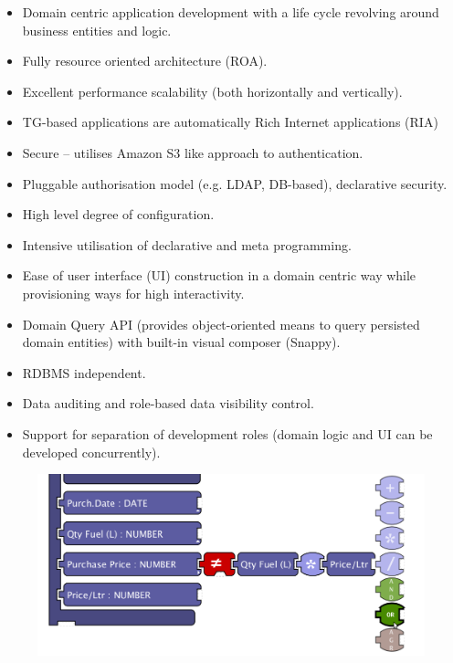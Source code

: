 \documentclass[a4paper,12pt,twocolumn,oneside,openright,final]{memoir}
\begin{document}
  \begin{itemize}
    \item Domain centric application development with a life cycle revolving around business entities and logic.
    \item Fully resource oriented architecture (ROA).
    \item Excellent performance scalability (both horizontally and vertically).
    \item TG-based applications are automatically Rich Internet applications (RIA)
    \item Secure -- utilises Amazon S3 like approach to authentication.
    \item Pluggable authorisation model (e.g. LDAP, DB-based), declarative security.
    \item High level degree of configuration.
    \item Intensive utilisation of declarative and meta programming.    
    \item Ease of user interface (UI) construction in a domain centric way while provisioning ways for high interactivity.
    \item Domain Query API (provides object-oriented means to query persisted domain entities) with built-in visual composer (Snappy).
    \item RDBMS independent.
    \item Data auditing and role-based data visibility control.
    \item Support for separation of development roles (domain logic and UI can be developed concurrently).
  \end{itemize}

  \begin{figure}[!h]
  \centering
  \includegraphics[scale=0.22]{images/01-rulesarea-suggestionmenu.png}  
  \end{figure}
\end{document}
